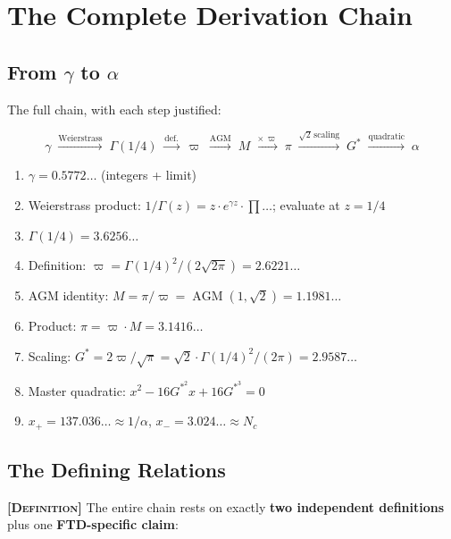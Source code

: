 \documentclass[11pt, letterpaper]{article}
\newcommand{\G}{G^*}
\DeclareMathOperator{\AGM}{AGM}
\theoremstyle{definition}
\theoremstyle{remark}
\newcommand{\epi}[1]{\textbf{\textsc{[#1]}}}
\begin{document}
\section{The Complete Derivation Chain}

\subsection{From $\gamma$ to $\alpha$}

The full chain, with each step justified:

\begin{equation}
    \boxed{\gamma \;\xrightarrow{\text{Weierstrass}}\; \Gamma(1/4) \;\xrightarrow{\text{def.}}\; \varpi \;\xrightarrow{\text{AGM}}\; M \;\xrightarrow{\times\,\varpi}\; \pi \;\xrightarrow{\sqrt{2}\,\text{scaling}}\; \G \;\xrightarrow{\text{quadratic}}\; \alpha}
\end{equation}

\begin{enumerate}[noitemsep]
    \item $\gamma = 0.5772\ldots$ (integers + limit)
    \item Weierstrass product: $1/\Gamma(z) = z \cdot e^{\gamma z} \cdot \prod\ldots$; evaluate at $z = 1/4$
    \item $\Gamma(1/4) = 3.6256\ldots$
    \item Definition: $\varpi = \Gamma(1/4)^2/(2\sqrt{2\pi}) = 2.6221\ldots$
    \item AGM identity: $M = \pi/\varpi = \AGM(1,\sqrt{2}) = 1.1981\ldots$
    \item Product: $\pi = \varpi \cdot M = 3.1416\ldots$
    \item Scaling: $\G = 2\varpi/\sqrt{\pi} = \sqrt{2}\cdot\Gamma(1/4)^2/(2\pi) = 2.9587\ldots$
    \item Master quadratic: $x^2 - 16\G^2 x + 16\G^3 = 0$
    \item $x_+ = 137.036\ldots \approx 1/\alpha$, \quad $x_- = 3.024\ldots \approx N_c$
\end{enumerate}

\subsection{The Defining Relations}

\epi{Definition} The entire chain rests on exactly \textbf{two independent definitions} plus one \textbf{FTD-specific claim}:
\end{document}
